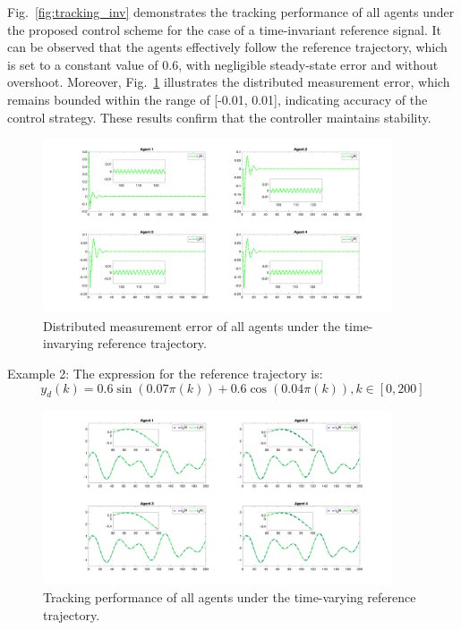 \documentclass[journal,onecolumn]{IEEEtran}
\begin{document}
Fig.~\ref{fig:tracking_inv} demonstrates the tracking performance of all agents under the proposed control scheme for the case of a time-invariant reference signal. It can be observed that the agents effectively follow the reference trajectory, which is set to a constant value of 0.6, with negligible steady-state error and without overshoot.
Moreover, Fig.~\ref{fig:error_inv} illustrates the distributed measurement error, which remains bounded within the range of [-0.01, 0.01], indicating accuracy of the control strategy. These results confirm that the controller maintains stability.


\begin{figure}[H]
    \centering
    \includegraphics[width=0.92\textwidth]{inv_error.png}
    \caption{Distributed measurement error of all agents under the time-invarying reference trajectory.}
    \label{fig:error_inv} %
\end{figure}


Example 2: The expression for the reference trajectory is:
\[ y_d(k)=0.6\sin(0.07\pi(k))+0.6\cos(0.04\pi(k)), k \in [0, 200] \]

\begin{figure}[H]
    \centering
    \includegraphics[width=0.922\textwidth]{var_tracking.png}
    \caption{Tracking performance of all agents under the time-varying reference trajectory.}
    \label{fig:tracking_var} %
\end{figure}
\end{document}
